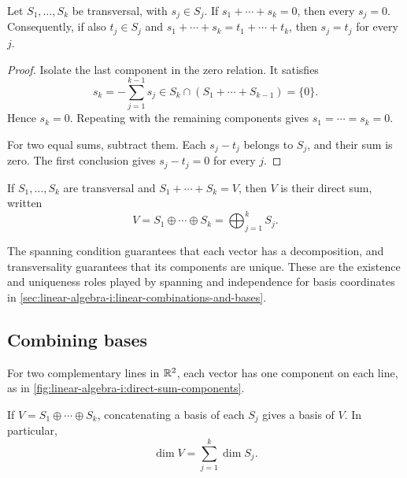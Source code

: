\begin{proposition}
  \label{thm:linear-algebra-i:transversal-unique-components}
  Let \(S_1,\ldots,S_k\) be transversal, with \(s_j\in S_j\).
  If \(s_1+\cdots+s_k=0\), then every \(s_j=0\).
  Consequently, if also \(t_j\in S_j\) and
  \(s_1+\cdots+s_k=t_1+\cdots+t_k\), then \(s_j=t_j\) for every \(j\).
\end{proposition}

\begin{proof}
  Isolate the last component in the zero relation. It satisfies
  \[
    s_k=-\sum_{j=1}^{k-1}s_j
      \in S_k\cap(S_1+\cdots+S_{k-1})=\{0\}.
  \]
  Hence \(s_k=0\). Repeating with the remaining components gives
  \(s_1=\cdots=s_k=0\).

  For two equal sums, subtract them. Each \(s_j-t_j\) belongs to
  \(S_j\), and their sum is zero. The first conclusion gives
  \(s_j-t_j=0\) for every \(j\).
\end{proof}

\begin{definition}
  If \(S_1,\ldots,S_k\) are transversal and
  \(S_1+\cdots+S_k=V\), then \(V\) is their direct sum, written
  \[
    V=S_1\oplus\cdots\oplus S_k=\bigoplus_{j=1}^k S_j.
  \]
\end{definition}

The spanning condition guarantees that each vector has a decomposition,
and transversality guarantees that its components are unique. These are
the existence and uniqueness roles played by spanning and independence
for basis coordinates in
\autoref{sec:linear-algebra-i:linear-combinations-and-bases}.

\subsection{Combining bases}

For two complementary lines in \(\mathbb{R}^2\), each vector has one component
on each line, as in \autoref{fig:linear-algebra-i:direct-sum-components}.
\begin{marginfigure}
  \centering
  
  \caption[Components in a direct sum]{A real-plane schematic of
    \(V=S\oplus T\). The decomposition \(v=s+t\), with \(s\in S\)
    and \(t\in T\), is unique. The summands need not be perpendicular.}
  \label{fig:linear-algebra-i:direct-sum-components}
\end{marginfigure}

\begin{proposition}
  \label{thm:linear-algebra-i:direct-sum-bases}
  If \(V=S_1\oplus\cdots\oplus S_k\), concatenating a basis of each
  \(S_j\) gives a basis of \(V\). In particular,
  \[
    \dim V=\sum_{j=1}^k\dim S_j.
  \]
\end{proposition}


